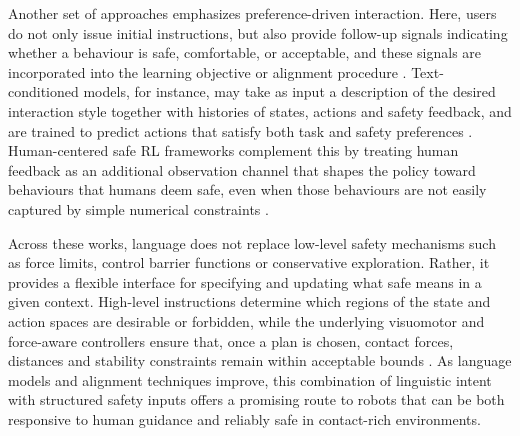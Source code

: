 \documentclass[Afour,sageh,times]{template/sagej}
\begin{document}
Another set of approaches emphasizes preference-driven interaction. Here, users do not only issue initial instructions, but also provide follow-up signals indicating whether a behaviour is safe, comfortable, or acceptable, and these signals are incorporated into the learning objective or alignment procedure \citep{33,54}. Text-conditioned models, for instance, may take as input a description of the desired interaction style together with histories of states, actions and safety feedback, and are trained to predict actions that satisfy both task and safety preferences \citep{33,51}. Human-centered safe RL frameworks complement this by treating human feedback as an additional observation channel that shapes the policy toward behaviours that humans deem safe, even when those behaviours are not easily captured by simple numerical constraints \citep{54}.

Across these works, language does not replace low-level safety mechanisms such as force limits, control barrier functions or conservative exploration. Rather, it provides a flexible interface for specifying and updating what safe means in a given context. High-level instructions determine which regions of the state and action spaces are desirable or forbidden, while the underlying visuomotor and force-aware controllers ensure that, once a plan is chosen, contact forces, distances and stability constraints remain within acceptable bounds \citep{8,33,51,54}. As language models and alignment techniques improve, this combination of linguistic intent with structured safety inputs offers a promising route to robots that can be both responsive to human guidance and reliably safe in contact-rich environments.
\end{document}
